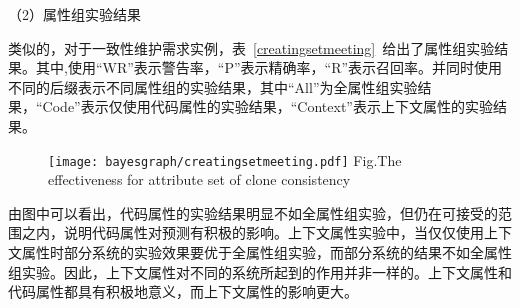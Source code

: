 （2）属性组实验结果

类似的，对于一致性维护需求实例，表~\ref{creatingsetmeeting}~给出了属性组实验结果。其中,使用“WR”表示警告率，“P”表示精确率，“R”表示召回率。并同时使用不同的后缀表示不同属性组的实验结果，其中“All”为全属性组实验结果，“Code”表示仅使用代码属性的实验结果，“Context”表示上下文属性的实验结果。

\begin{figure}[htbp]
\centering
\texttt{[image: bayesgraph/creatingsetmeeting.pdf]}
{Fig.$\!$}{The effectiveness for attribute set of clone consistency}
\vspace{-1em}
\end{figure}

由图中可以看出，代码属性的实验结果明显不如全属性组实验，但仍在可接受的范围之内，说明代码属性对预测有积极的影响。上下文属性实验中，当仅仅使用上下文属性时部分系统的实验效果要优于全属性组实验，而部分系统的结果不如全属性组实验。因此，上下文属性对不同的系统所起到的作用并非一样的。上下文属性和代码属性都具有积极地意义，而上下文属性的影响更大。


